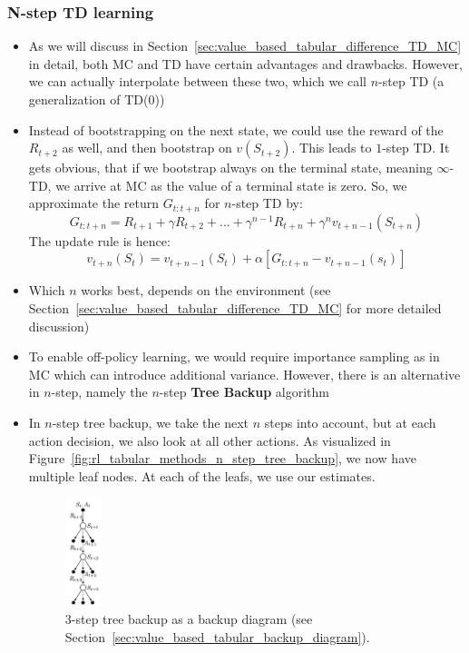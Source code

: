 \subsubsection{N-step TD learning}
\begin{itemize}
	\item As we will discuss in Section~\ref{sec:value_based_tabular_difference_TD_MC} in detail, both MC and TD have certain advantages and drawbacks. However, we can actually interpolate between these two, which we call $n$-step TD (a generalization of TD(0))
	\item Instead of bootstrapping on the next state, we could use the reward of the $R_{t+2}$ as well, and then bootstrap on $v(S_{t+2})$. This leads to $1$-step TD. It gets obvious, that if we bootstrap always on the terminal state, meaning $\infty$-TD, we arrive at MC as the value of a terminal state is zero. So, we approximate the return $G_{t:t+n}$ for $n$-step TD by:
	$$G_{t:t+n} = R_{t+1}+\gamma R_{t+2} + ... + \gamma^{n-1}R_{t+n} + \gamma^n v_{t+n-1}(S_{t+n})$$
	The update rule is hence:
	$$v_{t+n}(S_t) = v_{t+n-1}(S_t) + \alpha \left[G_{t:t+n}- v_{t+n-1}(s_t)\right]$$
	\item Which $n$ works best, depends on the environment (see Section~\ref{sec:value_based_tabular_difference_TD_MC} for more detailed discussion)
	\item To enable off-policy learning, we would require importance sampling as in MC which can introduce additional variance. However, there is an alternative in $n$-step, namely the $n$-step \textbf{Tree Backup} algorithm
	\item In $n$-step tree backup, we take the next $n$ steps into account, but at each action decision, we also look at all other actions. As visualized in Figure~\ref{fig:rl_tabular_methods_n_step_tree_backup}, we now have multiple leaf nodes. At each of the leafs, we use our estimates.
	\begin{figure}[ht!]
		\centering
		\includegraphics[width=0.1\textwidth]{figures/rl_tabular_methods_n_step_tree_backup.png}
		\caption{3-step tree backup as a backup diagram (see Section~\ref{sec:value_based_tabular_backup_diagram}).}

\end{figure}
\end{itemize}

